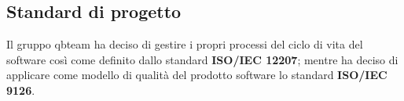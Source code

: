\subsection{Standard di progetto}
Il gruppo qbteam ha deciso di gestire i propri processi del ciclo di vita del software così come definito dallo standard \textbf{ISO/IEC 12207}; 
mentre ha deciso di applicare come modello di qualità del prodotto software lo standard \textbf{ISO/IEC 9126}.